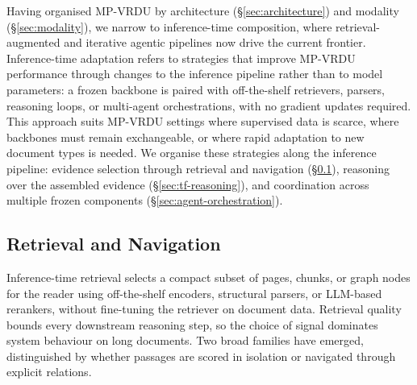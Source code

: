 \documentclass[11pt]{article}
\begin{document}
Having organised MP-VRDU by architecture (\S\ref{sec:architecture}) and modality (\S\ref{sec:modality}), we narrow to inference-time composition, where retrieval-augmented and iterative agentic pipelines now drive the current frontier. Inference-time adaptation refers to strategies that improve MP-VRDU performance through changes to the inference pipeline rather than to model parameters: a frozen backbone is paired with off-the-shelf retrievers, parsers, reasoning loops, or multi-agent orchestrations, with no gradient updates required. This approach suits MP-VRDU settings where supervised data is scarce, where backbones must remain exchangeable, or where rapid adaptation to new document types is needed. We organise these strategies along the inference pipeline: evidence selection through retrieval and navigation (\S\ref{sec:tf-retrieval}), reasoning over the assembled evidence (\S\ref{sec:tf-reasoning}), and coordination across multiple frozen components (\S\ref{sec:agent-orchestration}).

\subsection{Retrieval and Navigation}
\label{sec:tf-retrieval}

Inference-time retrieval selects a compact subset of pages, chunks, or graph nodes for the reader using off-the-shelf encoders, structural parsers, or LLM-based rerankers, without fine-tuning the retriever on document data. Retrieval quality bounds every downstream reasoning step, so the choice of signal dominates system behaviour on long documents. Two broad families have emerged, distinguished by whether passages are scored in isolation or navigated through explicit relations.
\end{document}
